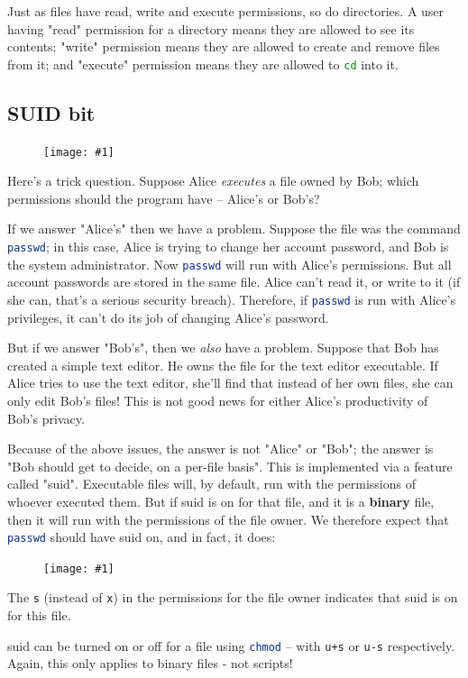 \documentclass{article}
\newcommand{\displayimage}[1] {
\begin{figure}[H]
    \centering
    \texttt{[image: \#1]} 
\end{figure}
}
\newcommand{\wrapimageright}[1] {
    \begin{figure}
        \begin{center}
            \texttt{[image: \#1]} 
        \end{center}
    \end{figure}
}
\newcommand{\xcode}[2]{\colorbox{ubuntuback}{\lstinline[language=#1]|#2|}}
\begin{document}
Just as files have read, write and execute permissions, so do directories. A user having "read" permission for a directory means they are allowed to see its contents; "write" permission means they are allowed to create and remove files from it; and "execute" permission means they are allowed to \xcode{bash}{cd} into it.

\subsection{SUID bit}

\wrapimageright{./images/baton.png}
Here's a trick question. Suppose Alice \textit{executes} a file owned by Bob; which permissions should the program have -- Alice's or Bob's?

If we answer "Alice's" then we have a problem. Suppose the file was the command \xcode{bash}{passwd}; in this case, Alice is trying to change her account password, and Bob is the system administrator. Now \xcode{bash}{passwd} will run with Alice's permissions. But all account passwords are stored in the same file. Alice can't read it, or write to it (if she can, that's a serious security breach). Therefore, if \xcode{bash}{passwd} is run with Alice's privileges, it can't do its job of changing Alice's password.

But if we answer "Bob's", then we \textit{also} have a problem. Suppose that Bob has created a simple text editor. He owns the file for the text editor executable. If Alice tries to use the text editor, she'll find that instead of her own files, she can only edit Bob's files! This is not good news for either Alice's productivity of Bob's privacy. 

Because of the above issues, the answer is not "Alice" or "Bob"; the answer is "Bob should get to decide, on a per-file basis". This is implemented via a feature called "suid". Executable files will, by default, run with the permissions of whoever executed them. But if suid is on for that file, and it is a \textbf{binary} file, then it will run with the permissions of the file owner. We therefore expect that \xcode{bash}{passwd} should have suid on, and in fact, it does:

\displayimage{./images/suid_passwd.png}


The \xcode{bash}{s} (instead of \xcode{bash}{x}) in the permissions for the file owner indicates that suid is on for this file. 

suid can be turned on or off for a file using \xcode{bash}{chmod} -- with \xcode{bash}{u+s} or \xcode{bash}{u-s} respectively. Again, this only applies to binary files - not scripts!
\end{document}

